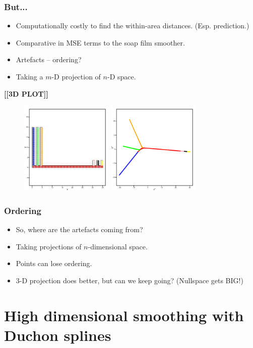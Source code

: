 \documentclass[ignorenonframetext]{beamer} %
\newcommand{\bi}{\begin{itemize}}
\newcommand{\ei}{\end{itemize}}
\begin{document}
\begin{frame}
	\frametitle{But...}
          \bi
            \item Computationally costly to find the within-area distances. (Esp. prediction.)
            \item Comparative in MSE terms to the soap film smoother.
            \item Artefacts -- ordering?
            \item Taking a $m$-D projection of $n$-D space.
           \ei
	\textbf{[[3D PLOT]]}
	\begin{figure}
	         	\centering
              \includegraphics[height=1.75in]{figs/comb.pdf} \includegraphics[height=1.75in]{figs/comb-2d.pdf}
	\end{figure}
\end{frame}



\begin{frame}
	\frametitle{Ordering}
	\bi
		\item So, where are the artefacts coming from?
		\item Taking projections of $n$-dimensional space.
		\item Points can lose ordering.
		\item 3-D projection does better, but can we keep going? (Nullspace gets BIG!)
	\ei
\end{frame}


\section{High dimensional smoothing with Duchon splines}
\end{document}
